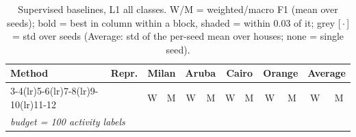 \begin{table}[H]
\centering\small
\caption{Supervised baselines, L1 all classes. W/M = weighted/macro F1 (mean over seeds); bold = best in column within a block, shaded = within 0.03 of it; grey [\,$\cdot$\,] = std over seeds (Average: std of the per-seed mean over houses; none = single seed).}
\label{tab:base_l1_all}
\setlength{\tabcolsep}{3.2pt}
\begin{tabular}{llcc|cc|cc|cc|cc}
\toprule
Method & Repr. & \multicolumn{2}{c}{Milan} & \multicolumn{2}{c}{Aruba} & \multicolumn{2}{c}{Cairo} & \multicolumn{2}{c}{Orange} & \multicolumn{2}{c}{Average} \\
\cmidrule(lr){3-4}\cmidrule(lr){5-6}\cmidrule(lr){7-8}\cmidrule(lr){9-10}\cmidrule(lr){11-12}
 & & W & M & W & M & W & M & W & M & W & M \\
\midrule
\multicolumn{12}{l}{\textit{budget = 100 activity labels}} \\
\midrule

\end{tabular}
\end{table}
